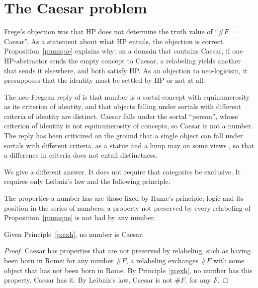 \documentclass{situationist-preprint}
\begin{document}
\section{The Caesar problem}\label{s:caesar}

Frege's objection was that HP does not determine the truth value of \enquote{$\#F = $ Caesar}. As a statement about what HP entails, the objection is correct. Proposition~\ref{p:unique} explains why: on a domain that contains Caesar, if one HP-abstractor sends the empty concept to Caesar, a relabeling yields another that sends it elsewhere, and both satisfy HP. As an objection to neo-logicism, it presupposes that the identity must be settled by HP or not at all.

The neo-Fregean reply of \citet[ch.~14]{HaleWright2001} is that number is a sortal concept with equinumerosity as its criterion of identity, and that objects falling under sortals with different criteria of identity are distinct. Caesar falls under the sortal \enquote{person}, whose criterion of identity is not equinumerosity of concepts, so Caesar is not a number. The reply has been criticized on the ground that a single object can fall under sortals with different criteria, as a statue and a lump may on some views \citep{MacBride2003}, so that a difference in criteria does not entail distinctness.

We give a different answer. It does not require that categories be exclusive. It requires only Leibniz's law and the following principle.

\begin{principle}\label{p:exh}
The properties a number has are those fixed by Hume's principle, logic and its position in the series of numbers; a property not preserved by every relabeling of Proposition~\ref{p:unique} is not had by any number.
\end{principle}

\begin{proposition}\label{p:caesar}
Given Principle~\ref{p:exh}, no number is Caesar.
\end{proposition}

\begin{proof}
Caesar has properties that are not preserved by relabeling, such as having been born in Rome: for any number $\#F$, a relabeling exchanges $\#F$ with some object that has not been born in Rome. By Principle~\ref{p:exh}, no number has this property. Caesar has it. By Leibniz's law, Caesar is not $\#F$, for any $F$.
\end{proof}
\end{document}
